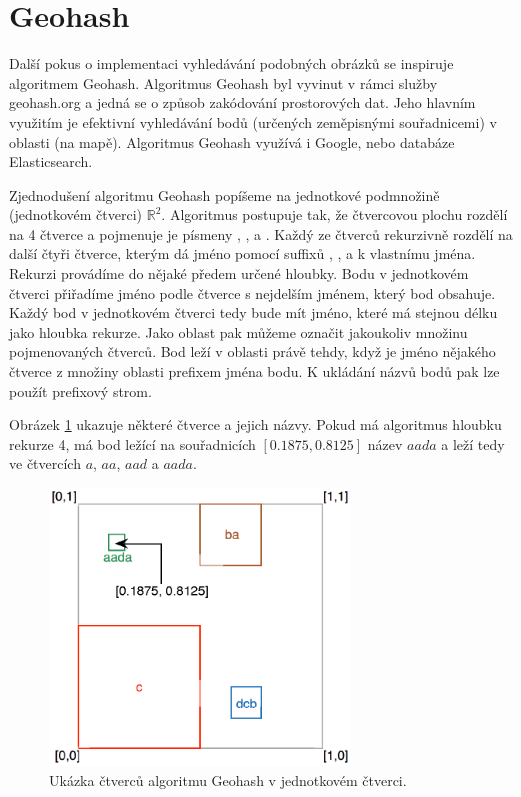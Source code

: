 \section{Geohash}
Další pokus o implementaci vyhledávání podobných obrázků se inspiruje algoritmem Geohash\cite{geohash}. Algoritmus Geohash byl vyvinut v rámci služby geohash.org a jedná se o způsob zakódování prostorových dat. Jeho hlavním využitím je efektivní vyhledávání bodů (určených zeměpisnými souřadnicemi) v oblasti (na mapě). Algoritmus Geohash využívá i Google, nebo databáze Elasticsearch.

Zjednodušení algoritmu Geohash popíšeme na jednotkové podmnožině (jednotkovém čtverci) $\mathbb{R}^2$. Algoritmus postupuje tak, že čtvercovou plochu rozdělí na 4 čtverce a pojmenuje je písmeny , ,  a . Každý ze čtverců rekurzivně rozdělí na další čtyři čtverce, kterým dá jméno pomocí suffixů , ,  a  k vlastnímu jména. Rekurzi provádíme do nějaké předem určené hloubky. Bodu v jednotkovém čtverci přiřadíme jméno podle čtverce s nejdelším jménem, který bod obsahuje. Každý bod v jednotkovém čtverci tedy bude mít jméno, které má stejnou délku jako hloubka rekurze. Jako oblast pak můžeme označit jakoukoliv množinu pojmenovaných čtverců. Bod leží v oblasti právě tehdy, když je jméno nějakého čtverce z množiny oblasti prefixem jména bodu. K ukládání názvů bodů pak lze použít prefixový strom.

Obrázek \ref{fig:geohash} ukazuje některé čtverce a jejich názvy. Pokud má algoritmus hloubku rekurze 4, má bod ležící na souřadnicích $[0.1875, 0.8125]$ název $aada$ a leží tedy ve čtvercích $a$, $aa$, $aad$ a $aada$.


\begin{figure}[h]
  \centering
  \includegraphics[width=80mm]{geohash.eps}
  \caption{Ukázka čtverců algoritmu Geohash v jednotkovém čtverci.}
  \label{fig:geohash}
\end{figure}

